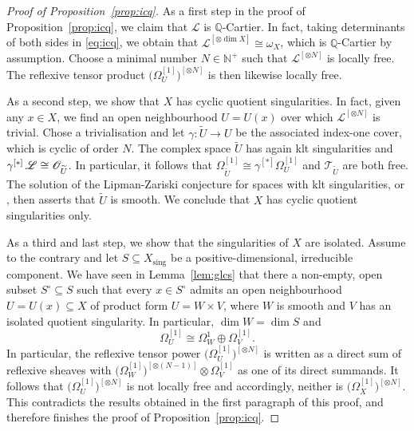 \documentclass[JEP,XML,SOM,Unicode,published]{cedram}
\let\scr\mathscr
\theoremstyle{plain}
\theoremstyle{definition}
\numberwithin{equation}{thm}
\numberwithin{enumi}{thm}
\DeclareMathOperator{\sing}{sing}
\newcommand{\sL}{\scr{L}}
\newcommand{\sO}{\scr{O}}
\newcommand{\sT}{\scr{T}}
\newcommand{\bN}{\mathbb{N}}
\newcommand{\bQ}{\mathbb{Q}}
\let\wtilde\widetilde
\begin{document}
\begin{proof}[Proof of Proposition~\ref{prop:icq}]
As a first step in the proof of Proposition~\ref{prop:icq}, we claim that $\sL$
is $\bQ$-Cartier. In fact, taking determinants of both sides in \eqref{eq:icq},
we obtain that $\sL^{[\otimes \dim X]} \cong \omega_X$, which is $\bQ$-Cartier by assumption.
Choose a minimal number $N \in \bN^+$ such that $\sL^{[\otimes N]}$ is locally free. The
reflexive tensor product $\bigl(\Omega^{[1]}_U \bigr)^{[\otimes N]}$ is then likewise
locally free.

As a second step, we show that $X$ has cyclic quotient singularities. In
fact, given any $x \in X$, we find an open neighbourhood $U=U(x)$ over which
$\sL^{[\otimes N]}$ is trivial. Chose a trivialisation and let $\gamma: \wtilde{U} \to U$ be
the associated index-one cover, which is cyclic of order $N$. The complex
space $\wtilde{U}$ has again klt singularities and
$\gamma^{[*]}\, \sL \cong\nobreak \sO_{\wtilde{U}}$. In particular, it follows that
$\Omega^{[1]}_{\wtilde{U}} \cong \gamma^{[*]} \Omega^{[1]}_U$ and $\sT_{\wtilde U}$ are both free.
The solution of the Lipman-Zariski conjecture for spaces with klt
singularities, \cite[Th.\,3.8 \& comments after Th.\,1.1]{Druel13a} or
\cite[Th.\,1.13]{KS18}, then asserts that $\wtilde{U}$ is smooth. We conclude
that $X$ has cyclic quotient singularities only.

As a third and last step, we show that the singularities of $X$ are isolated.
Assume to the contrary and let $S \subseteq X_{\sing}$ be a positive-dimensional,
irreducible component. We have seen in Lemma~\ref{lem:glcs} that there a
non-empty, open subset $S^\circ \subseteq S$ such that every $x \in S^\circ$ admits an open
neighbourhood $U = U(x) \subseteq X$ of product form $U = W \times V$, where $W$ is smooth
and $V$ has an isolated quotient singularity. In particular,
$\dim W = \dim S$ and
\[
\Omega^{[1]}_U \cong \Omega^1_W \oplus \Omega^{[1]}_V.
\]
In particular, the reflexive tensor power $\bigl(\Omega^{[1]}_U \bigr)^{[\otimes N]}$ is
written as a direct sum of reflexive sheaves with
$\bigl(\Omega^{[1]}_W \bigr)^{[\otimes (N-1)]} \otimes \Omega^{[1]}_V$ as one of its direct
summands. It follows that $\bigl(\Omega^{[1]}_U \bigr)^{[\otimes N]}$ is not locally
free and accordingly, neither is $\bigl(\Omega^{[1]}_X \bigr)^{[\otimes N]}$. This
contradicts the results obtained in the first paragraph of this proof, and
therefore finishes the proof of Proposition~\ref{prop:icq}.
\end{proof}
\end{document}
